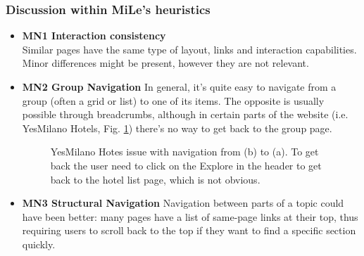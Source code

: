 \pagebreak

\subsubsection{Discussion within MiLe's heuristics}
\begin{itemize}
    \item \textbf{MN1 Interaction consistency}\\
        Similar pages have the same type of layout, links and interaction capabilities. Minor differences might be present, however they are not relevant.
    \item \textbf{MN2 Group Navigation}
        In general, it's quite easy to navigate from a group (often a grid or list) to one of its items. The opposite is usually possible through breadcrumbs, although in certain parts of the website (i.e. YesMilano Hotels, Fig. \ref{fig:MN2-1}) there's no way to get back to the group page.
        \begin{figure}[!ht]
            \centering
            \qquad
            \caption{YesMilano Hotes issue with navigation from (b) to (a). To get back the user need to click on the Explore in the header to get back to the hotel list page, which is not obvious.}%
            \label{fig:MN2-1}%
        \end{figure}
    \item \textbf{MN3 Structural Navigation}
        Navigation between parts of a topic could have been better: many pages have a list of same-page links at their top, thus requiring users to scroll back to the top if they want to find a specific section quickly. 


\end{itemize}
